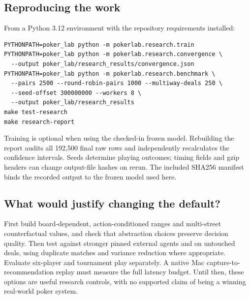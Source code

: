 \documentclass[10pt,letterpaper]{article}
\begin{document}
\subsection*{Reproducing the work}
From a Python 3.12 environment with the repository requirements installed:
\begin{verbatim}
PYTHONPATH=poker_lab python -m pokerlab.research.train
PYTHONPATH=poker_lab python -m pokerlab.research.convergence \
  --output poker_lab/research_results/convergence.json
PYTHONPATH=poker_lab python -m pokerlab.research.benchmark \
  --pairs 2500 --round-robin-pairs 1000 --multiway-deals 250 \
  --seed-offset 300000000 --workers 8 \
  --output poker_lab/research_results
make test-research
make research-report
\end{verbatim}
Training is optional when using the checked-in frozen model. Rebuilding the
report audits all 192,500 final raw rows and independently recalculates the
confidence intervals. Seeds determine playing outcomes; timing fields and
gzip headers can change output-file hashes on rerun. The included SHA256
manifest binds the recorded output to the frozen model used here.

\subsection*{What would justify changing the default?}
First build board-dependent, action-conditioned ranges and multi-street
counterfactual values, and check that abstraction choices preserve decision
quality. Then test against stronger pinned external agents and on untouched
deals, using duplicate matches and variance reduction where appropriate.
Evaluate six-player and tournament play separately. A native Mac capture-to-
recommendation replay must measure the full latency budget. Until then, these
options are useful research controls, with no supported claim of being a
winning real-world poker system.

\newpage
\small

\end{document}
